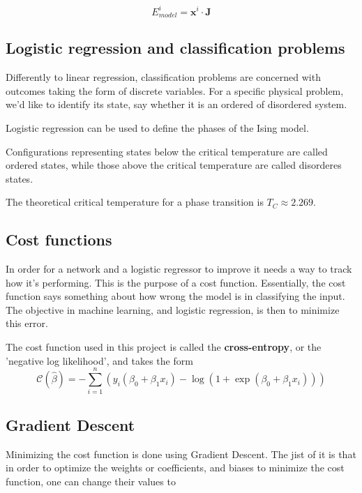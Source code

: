 \begin{equation}
	E_{model}^i = \mathbf{x}^i \cdot \mathbf{J}  
\end{equation}

\subsection{Logistic regression and classification problems}\label{seq:logistic}
Differently to linear regression, classification problems 
are concerned with outcomes taking the form of discrete variables. 
For a specific physical problem, we'd like to identify its state, say whether
it is an ordered of disordered system. ~\cite{LectureNotes-FysStk}

Logistic regression can be used to define the phases of the Ising
model.~\cite{LectureNotes} 

Configurations representing states below the critical temperature are called
ordered states, while those above the critical temperature are called 
disorderes states. ~\cite{Project2} 

The theoretical critical temperature for a phase transition is 
\(T_C \approx 2.269\). 

\subsection{Cost functions}\label{seq:cost}  
In order for a network and a logistic regressor to improve it needs a way to 
track how it's performing. This is the purpose of a cost function. Essentially,
the cost function says something about how wrong the model is in classifying the
input. The objective in machine learning, and logistic regression, is then to minimize
this error.

The cost function used in this project is called the \textbf{cross-entropy}, or the
'negative log likelihood', and takes the form
\begin{equation}\label{eq:cross-entropy}
	\mathcal{C}(\hat{\beta})=-\sum_{i=1}^n  \left(y_i(\beta_0+\beta_1x_i) -\log{(1+\exp{(\beta_0+\beta_1x_i)})}\right)
\end{equation}

\subsection{Gradient Descent}\label{seq:gradient}
Minimizing the cost function is done using Gradient Descent.
The jist of it is that in order to optimize the weights or coefficients, and biases
to minimize the cost function, one can change their values to 

